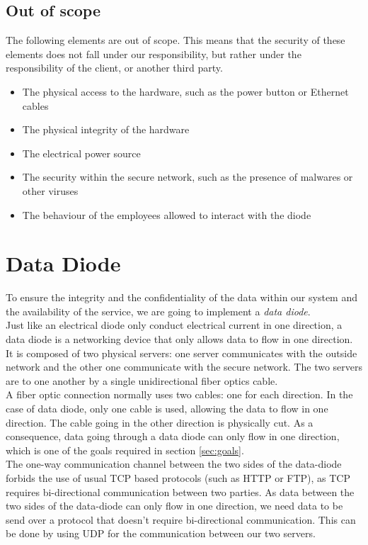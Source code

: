 \documentclass[a4paper,11pt]{article}
\begin{document}
\subsection{Out of scope}
\label{sec:outscope}
The following elements are out of scope. This means that the security of these elements does not fall under our responsibility, but rather under the responsibility of the client, or another third party.

\begin{itemize}
\item{The physical access to the hardware, such as the power button or Ethernet cables}
\item{The physical integrity of the hardware}
\item{The electrical power source}
\item{The security within the secure network, such as the presence of malwares or other viruses}
\item{The behaviour of the employees allowed to interact with the diode}
\end{itemize}


\section{Data Diode}
\label{sec:data-diode}
To ensure the integrity and the confidentiality of the data within our system and the availability of the service, we are going to implement a \textit{data diode}.\\

Just like an electrical diode only conduct electrical current in one direction, a data diode is a networking device that only allows data to flow in one direction. It is composed of two physical servers: one server communicates with the outside network and the other one communicate with the secure network. The two servers are to one another by a single unidirectional fiber optics cable.\\

A fiber optic connection normally uses two cables: one for each direction. In the case of 	 data diode, only one cable is used, allowing the data to flow in one direction. The cable going in the other direction is physically cut. As a consequence, data going through a data diode can only flow in one direction, which is one of the goals required in section \ref{sec:goals}.\\

The one-way communication channel between the two sides of the data-diode forbids the use of usual TCP based protocols (such as HTTP or FTP), as TCP requires bi-directional communication between two parties. As data between the two sides of the data-diode can only flow in one direction, we need data to be send over a protocol that doesn't require bi-directional communication. This can be done by using UDP for the communication between our two servers.\\
\end{document}
